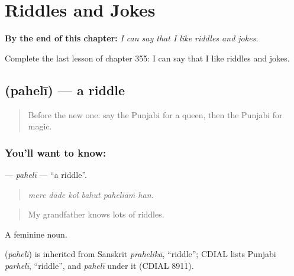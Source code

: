 
\chapter{Riddles and Jokes}
\label{ch:pa-a2-riddles-and-jokes}

\begin{chapteropening}
\textbf{By the end of this chapter:} \emph{I can say that I like riddles and jokes.}

Complete the last lesson of chapter 355: I can say that I like riddles and jokes.
\end{chapteropening}

\section[\texorpdfstring{\pa{ਪਹੇਲੀ} (pahelī)}{ਪਹੇਲੀ (pahelī)}]{ (pahelī) — a riddle}

\label{lesson:PA-C355-paheli}



\begin{quote}
Before the new one: say the Punjabi for a queen, then the Punjabi for magic.
\end{quote}

\subsection*{You'll want to know: }
\textbf{} — \emph{pahelī} — \textquotedblleft{}a riddle\textquotedblright{}.

\begin{quote}
     
\end{quote}

\begin{quote}
\emph{mere dāde kol bahut pahelīāṁ han.}
\end{quote}

\begin{quote}
My grandfather knows lots of riddles.
\end{quote}

A feminine noun.

\begin{cousinweb}
\textbf{} (\emph{pahelī}) is inherited from Sanskrit \emph{prahelikā}, \textquotedblleft{}riddle\textquotedblright{}; CDIAL lists Punjabi \emph{parhelī}, \textquotedblleft{}riddle\textquotedblright{}, and \emph{pahelī} under it (CDIAL 8911).
\end{cousinweb}

